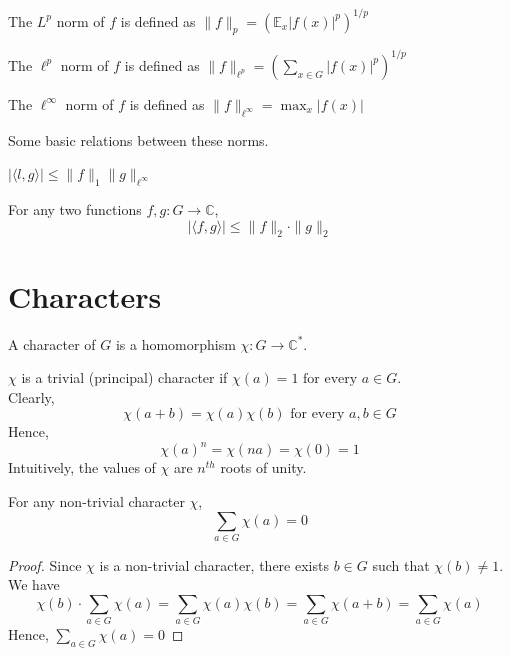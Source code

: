 \begin{definition}
The $L^p$ norm of $f$ is defined as $\| f \|_{p} = ({\mathbb{E}_x} |f(x)|^p)^{1/p} $
\end{definition}

\begin{definition}
The $\ell^p$ norm of $f$ is defined as $\| f \|_{\ell ^p} = (\sum\limits_{x \in G} |f(x)|^p)^{1/p} $
\end{definition}

\begin{definition}
The $\ell^\infty$ norm of $f$ is defined as $\| f \|_{\ell ^\infty} = \max_x |f(x)| $
\end{definition}

\noindent Some basic relations between these norms. 

\begin{prop}
$| \langle l,g \rangle | \leq \|f\|_1 \| g \|_{\ell^\infty}$
\end{prop}
\begin{prop}
For any two functions $f, g : G \rightarrow \mathbb{C}$,
$$| \langle f, g \rangle | \leq \|f \|_2 \cdot \| g \|_2$$
\end{prop}

\section{Characters}
\begin{definition} 
A character of $G$ is a homomorphism $\chi : G \rightarrow \mathbb{C}^*$.
\end{definition}
\noindent $\chi$ is a trivial (principal) character if $\chi(a) = 1 \text{ for every } a \in G$. \\
Clearly,
 $$\chi(a+b) = \chi(a) \chi(b) \text{ for every } a,b \in G $$
Hence,
$$\chi(a)^n = \chi(na) = \chi(0) = 1$$
Intuitively, the values of $\chi$ are $n^{th}$ roots of unity.
\begin{prop}
For any non-trivial character $\chi$, 
$$\sum\limits_{a \in G} \chi(a) = 0$$
\end{prop}
\begin{proof}
Since $\chi$ is a non-trivial character, there exists $b \in G$ such that $\chi(b) \neq 1$. We have
$$\chi(b) \cdot \sum\limits_{a \in G} \chi(a)
= \sum\limits_{a \in G} \chi(a) \chi(b)
= \sum\limits_{a \in G} \chi(a + b)
= \sum\limits_{a \in G} \chi(a)$$
Hence, $\sum\limits_{a \in G} \chi(a) = 0$
\end{proof}

